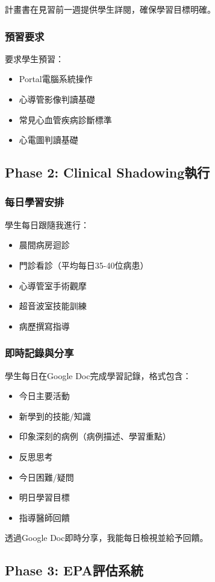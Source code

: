 \documentclass[12pt,a4paper]{article}
\begin{document}
計畫書在見習前一週提供學生詳閱，確保學習目標明確。

\subsubsection{預習要求}
要求學生預習：
\begin{itemize}
\item Portal電腦系統操作
\item 心導管影像判讀基礎
\item 常見心血管疾病診斷標準
\item 心電圖判讀基礎
\end{itemize}

\subsection{Phase 2: Clinical Shadowing執行}

\subsubsection{每日學習安排}
學生每日跟隨我進行：
\begin{itemize}
\item 晨間病房迴診
\item 門診看診（平均每日35-40位病患）
\item 心導管室手術觀摩
\item 超音波室技能訓練
\item 病歷撰寫指導
\end{itemize}

\subsubsection{即時記錄與分享}
學生每日在Google Doc完成學習記錄，格式包含：
\begin{itemize}
\item 今日主要活動
\item 新學到的技能/知識
\item 印象深刻的病例（病例描述、學習重點）
\item 反思思考
\item 今日困難/疑問
\item 明日學習目標
\item 指導醫師回饋
\end{itemize}

透過Google Doc即時分享，我能每日檢視並給予回饋。

\subsection{Phase 3: EPA評估系統}
\end{document}
